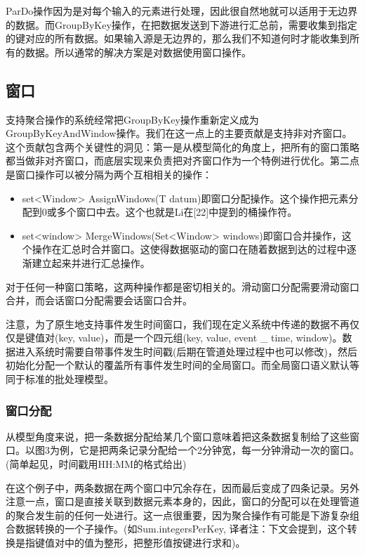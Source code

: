 \documentclass[oneside]{ctexbook}
\begin{document}
ParDo操作因为是对每个输入的元素进行处理，因此很自然地就可以适用于无边界的数据。而GroupByKey操作，在把数据发送到下游进行汇总前，需要收集到指定的键对应的所有数据。如果输入源是无边界的，那么我们不知道何时才能收集到所有的数据。所以通常的解决方案是对数据使用窗口操作。

\subsection{窗口}

支持聚合操作的系统经常把GroupByKey操作重新定义成为GroupByKeyAndWindow操作。我们在这一点上的主要贡献是支持非对齐窗口。这个贡献包含两个关键性的洞见：第一是从模型简化的角度上，把所有的窗口策略都当做非对齐窗口，而底层实现来负责把对齐窗口作为一个特例进行优化。第二点是窗口操作可以被分隔为两个互相相关的操作：

\begin{itemize}
\item set<Window> AssignWindows(T datum)即窗口分配操作。这个操作把元素分配到0或多个窗口中去。这个也就是Li在[22]中提到的桶操作符。
\item set<window> MergeWindows(Set<Window>  windows)即窗口合并操作，这个操作在汇总时合并窗口。这使得数据驱动的窗口在随着数据到达的过程中逐渐建立起来并进行汇总操作。
\end{itemize}

对于任何一种窗口策略，这两种操作都是密切相关的。滑动窗口分配需要滑动窗口合并，而会话窗口分配需要会话窗口合并。

注意，为了原生地支持事件发生时间窗口，我们现在定义系统中传递的数据不再仅仅是键值对(key, value)，而是一个四元组(key, value, event \_ time, window)。数据进入系统时需要自带事件发生时间戳(后期在管道处理过程中也可以修改)，然后初始化分配一个默认的覆盖所有事件发生时间的全局窗口。而全局窗口语义默认等同于标准的批处理模型。

\subsubsection{窗口分配}

从模型角度来说，把一条数据分配给某几个窗口意味着把这条数据复制给了这些窗口。以图3为例，它是把两条记录分配给一个2分钟宽，每一分钟滑动一次的窗口。(简单起见，时间戳用HH:MM的格式给出)

在这个例子中，两条数据在两个窗口中冗余存在，因而最后变成了四条记录。另外注意一点，窗口是直接关联到数据元素本身的，因此，窗口的分配可以在处理管道的聚合发生前的任何一处进行。这一点很重要，因为聚合操作有可能是下游复杂组合数据转换的一个子操作。(如Sum.integersPerKey, 译者注：下文会提到，这个转换是指键值对中的值为整形，把整形值按键进行求和)。
\end{document}
